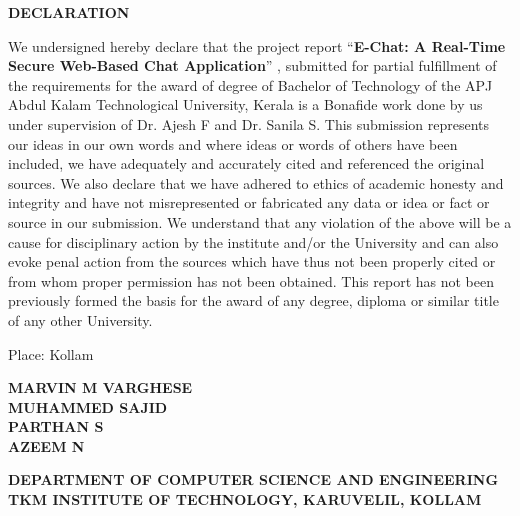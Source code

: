 \documentclass[12pt,a4paper,oneside]{report}
\begin{document}
\setcounter{page}{2}
{}
\label{front:declaration}
\begin{center}
{\large\textbf{DECLARATION}}
\end{center}

\vspace{1.5cm}

\begin{justify}
We undersigned hereby declare that the project report ``\textbf{E-Chat: A Real-Time Secure Web-Based Chat Application}'' , submitted for partial fulfillment of the requirements for the award of degree of Bachelor of Technology of the APJ Abdul Kalam Technological University, Kerala is a Bonafide work done by us under supervision of Dr. Ajesh F and Dr. Sanila S. This submission represents our ideas in our own words and where ideas or words of others have been included, we have adequately and accurately cited and referenced the original sources. We also declare that we have adhered to ethics of academic honesty and integrity and have not misrepresented or fabricated any data or idea or fact or source in our submission. We understand that any violation of the above will be a cause for disciplinary action by the institute and/or the University and can also evoke penal action from the sources which have thus not been properly cited or from whom proper permission has not been obtained. This report has not been previously formed the basis for the award of any degree, diploma or similar title of any other University.
\end{justify}

\vspace{1.2cm}

Place: Kollam

\vspace{1.5cm}

\begin{flushright}
\textbf{MARVIN M VARGHESE}\\[10pt]
\textbf{MUHAMMED SAJID}\\[10pt]
\textbf{PARTHAN S}\\[10pt]
\textbf{AZEEM N}
\end{flushright}

\newpage

\setcounter{page}{3}
{}
\label{front:certificate}
\begin{center}
{\large\textbf{DEPARTMENT OF COMPUTER SCIENCE AND ENGINEERING\\[4pt]
TKM INSTITUTE OF TECHNOLOGY, KARUVELIL, KOLLAM}}
\end{center}
\end{document}
